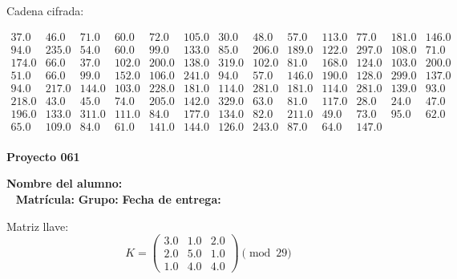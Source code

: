 \documentclass[12pt]{article}
\begin{document}
Cadena cifrada:
\begin{center}
$\begin{array}{lllllllllllll}
37.0 & 46.0 & 71.0 & 60.0 & 72.0 & 105.0 & 30.0 & 48.0 & 57.0 & 113.0 & 77.0 & 181.0 & 146.0\\
94.0 & 235.0 & 54.0 & 60.0 & 99.0 & 133.0 & 85.0 & 206.0 & 189.0 & 122.0 & 297.0 & 108.0 & 71.0\\
174.0 & 66.0 & 37.0 & 102.0 & 200.0 & 138.0 & 319.0 & 102.0 & 81.0 & 168.0 & 124.0 & 103.0 & 200.0\\
51.0 & 66.0 & 99.0 & 152.0 & 106.0 & 241.0 & 94.0 & 57.0 & 146.0 & 190.0 & 128.0 & 299.0 & 137.0\\
94.0 & 217.0 & 144.0 & 103.0 & 228.0 & 181.0 & 114.0 & 281.0 & 181.0 & 114.0 & 281.0 & 139.0 & 93.0\\
218.0 & 43.0 & 45.0 & 74.0 & 205.0 & 142.0 & 329.0 & 63.0 & 81.0 & 117.0 & 28.0 & 24.0 & 47.0\\
196.0 & 133.0 & 311.0 & 111.0 & 84.0 & 177.0 & 134.0 & 82.0 & 211.0 & 49.0 & 73.0 & 95.0 & 62.0\\
65.0 & 109.0 & 84.0 & 61.0 & 141.0 & 144.0 & 126.0 & 243.0 & 87.0 & 64.0 & 147.0\\
\end{array}$
\end{center}

\newpage


\textbf{Proyecto 061}

\textbf{Nombre del alumno:} \underline{\hspace{13cm}}\\\
\vspace{1cm}
\textbf{Matrícula:} \underline{\hspace{4cm}} \hspace{1cm}
\textbf{Grupo:} \underline{\hspace{2cm}}
\textbf{Fecha de entrega:} \underline{\hspace{2cm}}

\medskip

Matriz llave:
\[
K = \begin{pmatrix}
3.0 & 1.0 & 2.0\\
2.0 & 5.0 & 1.0\\
1.0 & 4.0 & 4.0
\end{pmatrix} \pmod{29}
\]
\end{document}
